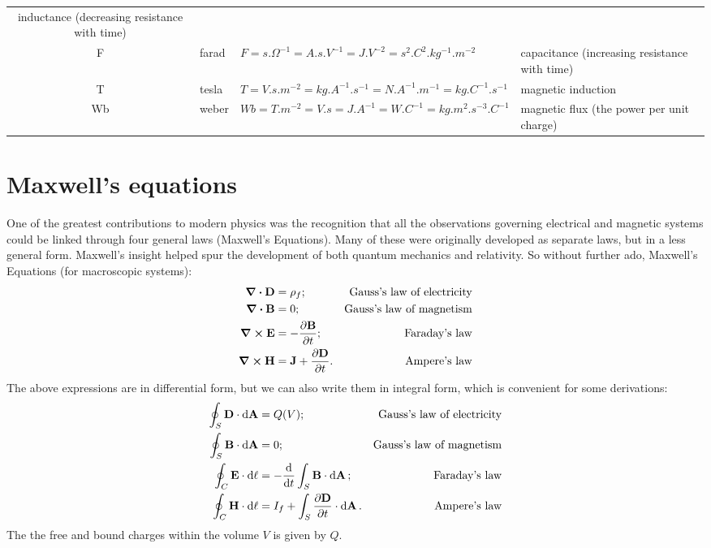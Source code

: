 \begin{table}[hbt]
\begin{tabularx}{\textwidth}{@{}cllX@{}}
        inductance (decreasing resistance with time)\\
    \si{F}       & farad         & $\si{F} = \si{s.\Omega^{-1}} = \si{A.s.V^{-1}} = 
        \si{J.V^{-2}} = \si{s^{2}.C^{2}.kg^{-1}.m^{-2}}$ &
        capacitance (increasing resistance with time) \\
    \si{T}       & tesla         & $\si{T} = \si{V.s.m^{-2}} = \si{kg.A^{-1}.s^{-1}} =
        \si{N.A^{-1}.m^{-1}} = \si{kg.C^{-1}.s^{-1}}$ &
        magnetic induction \\
    \si{Wb}      & weber         & $\si{Wb} = \si{T.m^{-2}} = \si{V.s} = \si{J.A^{-1}} =
        \si{W.C^{-1}} = \si{kg.m^{2}.s^{-3}.C^{-1}}$ &
        magnetic flux (the power per unit charge) \\
    \bottomrule
  \end{tabularx}
\end{table}


\section{Maxwell's equations}
One of the greatest contributions to modern physics was the recognition that all
the observations governing electrical and magnetic systems could be linked
through four general laws (Maxwell's Equations).  Many of these were originally
developed as separate laws, but in a less general form.  Maxwell's insight
helped spur the development of both quantum mechanics and relativity.  So
without further ado, Maxwell's Equations (for macroscopic systems):
\begin{align}
    \div \vb{D} & = \rho_{f}; & \text{Gauss's law of electricity} \\
    \div \vb{B} & =  0; & \text{Gauss's law of magnetism} \\
    \curl \vb{E} & = -\pdv{\vb{B}}{t};
        & \text{Faraday's law} \\
    \curl \vb{H} & = \vb{J} + \pdv{\vb{D}}{t}.
        & \text{Ampere's law}
\end{align}
The above expressions are in differential form, but we can also write them in
integral form, which is convenient for some derivations:
\begin{align}
    \oint_{S} \vb{D} \cdot \dd{\vb{A}} & = Q(V); &
        \text{Gauss's law of electricity} \\
    \oint_{S} \vb{B} \cdot \dd{\vb{A}} & = 0; &
        \text{Gauss's law of magnetism} \\
    \oint_{C} \vb{E} \cdot \dd{\vb{\ell}} & = - \dv{}{t} \int_{S}^{}
        \vb{B} \cdot \dd{\vb{A}}; &
        \text{Faraday's law} \\
    \oint_{C} \vb{H} \cdot \dd{\vb{\ell}} & = I_{f} + \int_{S}^{}
        \pdv{\vb{D}}{t} \cdot \dd{\vb{A}}. &
        \text{Ampere's law}
\end{align}
The the free and bound charges within the volume $V$ is given by $Q$.

